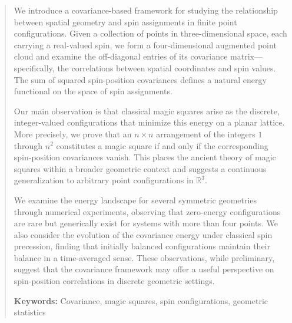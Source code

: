\begin{abstract}
We introduce a covariance-based framework for studying the relationship between spatial geometry and spin assignments in finite point configurations. Given a collection of points in three-dimensional space, each carrying a real-valued spin, we form a four-dimensional augmented point cloud and examine the off-diagonal entries of its covariance matrix---specifically, the correlations between spatial coordinates and spin values. The sum of squared spin-position covariances defines a natural energy functional on the space of spin assignments.

Our main observation is that classical magic squares arise as the discrete, integer-valued configurations that minimize this energy on a planar lattice. More precisely, we prove that an $n \times n$ arrangement of the integers $1$ through $n^2$ constitutes a magic square if and only if the corresponding spin-position covariances vanish. This places the ancient theory of magic squares within a broader geometric context and suggests a continuous generalization to arbitrary point configurations in $\mathbb{R}^3$.

We examine the energy landscape for several symmetric geometries through numerical experiments, observing that zero-energy configurations are rare but generically exist for systems with more than four points. We also consider the evolution of the covariance energy under classical spin precession, finding that initially balanced configurations maintain their balance in a time-averaged sense. These observations, while preliminary, suggest that the covariance framework may offer a useful perspective on spin-position correlations in discrete geometric settings.

\medskip
\noindent\textbf{Keywords:} Covariance, magic squares, spin configurations, geometric statistics
\end{abstract}

